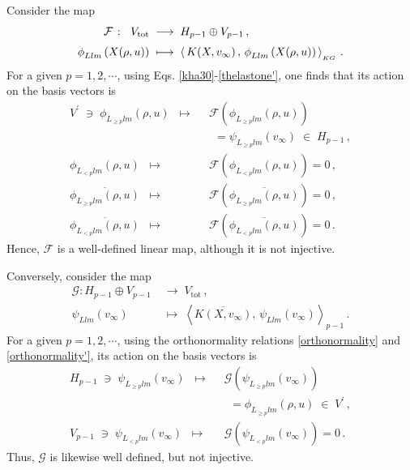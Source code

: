 \documentclass[aps,twocolumn,nofootinbib]{revtex4}
\begin{document}
{Consider the map
\begin{align}\label{eq:F-def-corrected}
    \mathcal{F} \;\colon\;\; V_{\text{tot}} &\;\longrightarrow\; H_{p-1} \oplus V_{p-1} \,,\nonumber\\[3pt]
    \phi_{Llm}^{}\left(X(\rho,u)\right) &\;\longmapsto\; \left\langle \, K(X, v_{\infty})\,,\, \phi_{Llm}^{}\left(X(\rho,u)\right) \,\right\rangle_{\vphantom{}_{KG}}\,.
\end{align}
For a given $p=1,2,\cdots$, using Eqs. \eqref{kha30}-\eqref{thelastone'}, one finds that its action on the basis vectors is
\begin{align}\label{F-action}
    V^\prime \;\ni\; \phi^{}_{L^{}_{\geqslant p}lm}(\rho,u) \;\;\longmapsto&\;\; {\mathcal{F}} \left(\phi^{}_{L^{}_{\geqslant p}lm}(\rho,u)\right) \nonumber\\[3pt]
    &\quad= \psi^{}_{L^{}_{\geqslant p}lm}(v_\infty) \;\in\; H_{p-1}\,, \\[3pt]
    \phi^{}_{L^{}_{<p}lm}(\rho,u) \;\;\longmapsto&\;\; {\mathcal{F}} \left(\phi^{}_{L^{}_{<p}lm}(\rho,u) \right) = 0 \,, \\[3pt]
    \overline{\phi^{}_{L^{}_{\geqslant p}lm}(\rho,u)} \;\;\longmapsto&\;\;{\mathcal{F}} \left(\overline{\phi^{}_{L^{}_{\geqslant p}lm}(\rho,u)} \right) = 0 \,, \\[3pt]
    \overline{\phi^{}_{L^{}_{<p}lm}(\rho,u)} \;\;\longmapsto&\;\;{\mathcal{F}} \left(\overline{\phi^{}_{L^{}_{<p}lm}(\rho,u)} \right) = 0\,.
\end{align}
Hence, $\mathcal F$ is a well-defined linear map, although it is not injective.

Conversely, consider the map
\begin{align}\label{eq:F-inv-L2}
    \mathcal{G}\colon H_{p-1}\oplus V_{p-1} & \;\longrightarrow\;V_{\text{tot}}\,,\nonumber\\[3pt]
    \psi_{Llm}^{}(v_\infty) & \;\longmapsto\; \left\langle \overline{K(X,v_\infty)},\,\psi_{Llm}^{}(v_\infty)\right\rangle_{p-1} \,.
\end{align}
For a given $p=1,2,\cdots$, using the orthonormality relations \eqref{orthonormality} and \eqref{orthonormality'}, its action on the basis vectors is
\begin{align}\label{inversaction}
    H_{p-1} \;\ni\; \psi^{}_{L^{}_{\geqslant p}lm}(v_\infty) \;\;\longmapsto&\;\; {\mathcal{G}} \left(\psi^{}_{L^{}_{\geqslant p}lm}(v_\infty)\right) \nonumber\\[3pt]
    &\quad= \phi^{}_{L^{}_{\geqslant p}lm}(\rho,u) \;\in\; V^\prime\,, \\[3pt] 
    V_{p-1} \;\ni\; \psi^{}_{L^{}_{< p}lm}(v_\infty) \;\;\longmapsto&\;\; {\mathcal{G}} \left(\psi^{}_{L^{}_{<p}lm}(v_\infty)\right) = 0 \,.
\end{align}
Thus, $\mathcal G$ is likewise well defined, but not injective.

}
\end{document}
